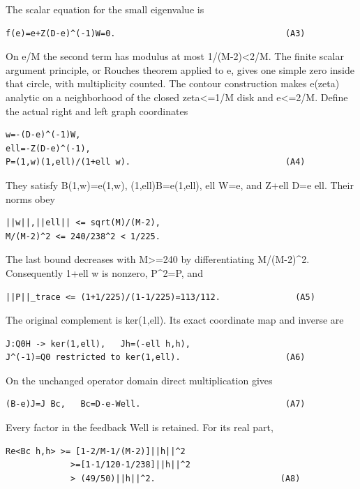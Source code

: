 \documentclass[11pt,a4paper]{article}
\renewcommand{\[}{\begingroup\small\originaldisplaystart}
\renewcommand{\]}{\originaldisplayend\endgroup}
\begin{document}
The scalar equation for the small eigenvalue is

\begin{verbatim}
f(e)=e+Z(D-e)^(-1)W=0.                                  (A3)
\end{verbatim}

On \textbar e/M the second term has modulus at most
1/(M-2)\textless2/M. The finite scalar argument principle, or
Rouche\textquotesingle s theorem applied to e, gives one simple zero
inside that circle, with multiplicity counted. The contour construction
makes e(zeta) analytic on a neighborhood of the closed
\textbar zeta\textbar\textless=1/M disk and
\textbar e\textbar\textless=2/M. Define the actual right and left graph
coordinates

\begin{verbatim}
w=-(D-e)^(-1)W,
ell=-Z(D-e)^(-1),
P=(1,w)(1,ell)/(1+ell w).                               (A4)
\end{verbatim}

They satisfy B(1,w)=e(1,w), (1,ell)B=e(1,ell), ell W=e, and Z+ell D=e
ell. Their norms obey

\begin{verbatim}
||w||,||ell|| <= sqrt(M)/(M-2),
M/(M-2)^2 <= 240/238^2 < 1/225.
\end{verbatim}

The last bound decreases with M\textgreater=240 by differentiating
M/(M-2)\^{}2. Consequently 1+ell w is nonzero, P\^{}2=P, and

\begin{verbatim}
||P||_trace <= (1+1/225)/(1-1/225)=113/112.               (A5)
\end{verbatim}

The original complement is ker(1,ell). Its exact coordinate map and
inverse are

\begin{verbatim}
J:Q0H -> ker(1,ell),   Jh=(-ell h,h),
J^(-1)=Q0 restricted to ker(1,ell).                     (A6)
\end{verbatim}

On the unchanged operator domain direct multiplication gives

\begin{verbatim}
(B-e)J=J Bc,   Bc=D-e-Well.                             (A7)
\end{verbatim}

Every factor in the feedback Well is retained. For its real part,

\begin{verbatim}
Re<Bc h,h> >= [1-2/M-1/(M-2)]||h||^2
             >=[1-1/120-1/238]||h||^2
             > (49/50)||h||^2.                         (A8)
\end{verbatim}
\end{document}
